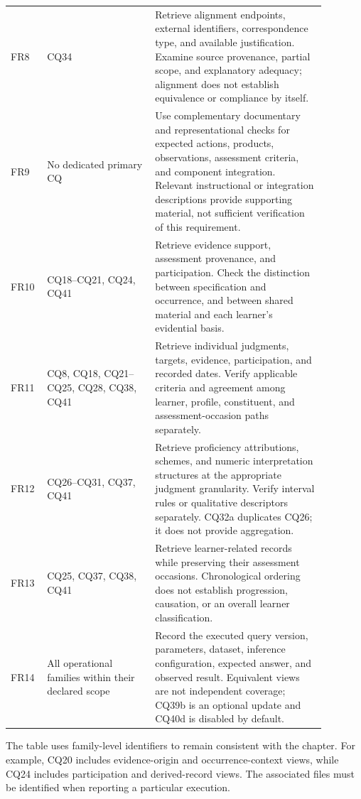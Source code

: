 \begin{longtable}{
    p{0.08\linewidth}
    p{0.31\linewidth}
    p{0.49\linewidth}
}
FR8 & CQ34 &
Retrieve alignment endpoints, external identifiers, correspondence type,
and available justification. Examine source provenance, partial scope,
and explanatory adequacy; alignment does not establish equivalence or
compliance by itself. \\

FR9 & No dedicated primary CQ &
Use complementary documentary and representational checks for expected
actions, products, observations, assessment criteria, and component
integration. Relevant instructional or integration descriptions provide
supporting material, not sufficient verification of this requirement. \\

FR10 & CQ18--CQ21, CQ24, CQ41 &
Retrieve evidence support, assessment provenance, and participation.
Check the distinction between specification and occurrence, and between
shared material and each learner's evidential basis. \\

FR11 & CQ8, CQ18, CQ21--CQ25, CQ28, CQ38, CQ41 &
Retrieve individual judgments, targets, evidence, participation, and
recorded dates. Verify applicable criteria and agreement among learner,
profile, constituent, and assessment-occasion paths separately. \\

FR12 & CQ26--CQ31, CQ37, CQ41 &
Retrieve proficiency attributions, schemes, and numeric interpretation
structures at the appropriate judgment granularity. Verify interval
rules or qualitative descriptors separately. CQ32a duplicates CQ26;
it does not provide aggregation. \\

FR13 & CQ25, CQ37, CQ38, CQ41 &
Retrieve learner-related records while preserving their assessment
occasions. Chronological ordering does not establish progression,
causation, or an overall learner classification. \\

FR14 & All operational families within their declared scope &
Record the executed query version, parameters, dataset, inference
configuration, expected answer, and observed result. Equivalent views
are not independent coverage; CQ39b is an optional update and CQ40d
is disabled by default. \\

\end{longtable}
\endgroup

The table uses family-level identifiers to remain consistent with the
chapter. For example, CQ20 includes evidence-origin and occurrence-context
views, while CQ24 includes participation and derived-record views. The
associated files must be identified when reporting a particular execution.

